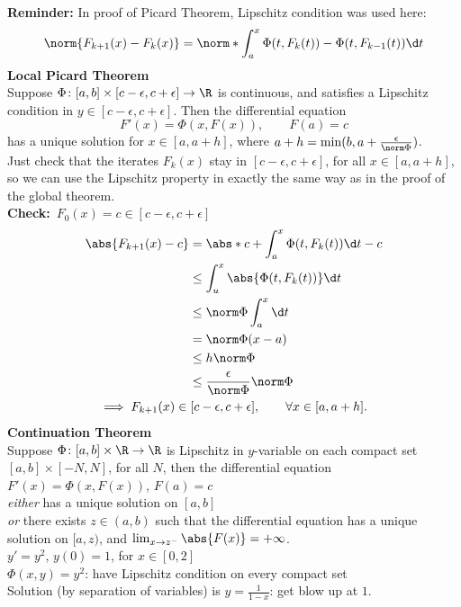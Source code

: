 \textbf{Reminder:} In proof of Picard Theorem, Lipschitz condition was used here:
\[ \norm{F_{k+1}(x)-F_k(x)} = \norm*{\int_a^x\Phi(t,F_k(t))-\Phi(t,F_{k-1}(t))\d t} \]
%
\textbf{Local Picard Theorem} \\
Suppose $\Phi\colon[a,b]\times[c-\epsilon,c+\epsilon]\to\R$ is continuous, and satisfies a Lipschitz condition in $y\in[c-\epsilon,c+\epsilon]$.  Then the differential equation
\[ F'(x) = \Phi(x,F(x)), \qquad F(a) = c \]
has a unique solution for $x\in[a,a+h]$, where $a+h=\min(b,a+\frac{\epsilon}{\norm\Phi})$. \\
\pf Just check that the iterates $F_k(x)$ stay in $[c-\epsilon,c+\epsilon]$, for all $x\in[a,a+h]$, so we can use the Lipschitz property in exactly the same way as in the proof of the global theorem. \\
\textbf{Check:}~$F_0(x)=c\in[c-\epsilon,c+\epsilon]$
\begin{gather*}
\begin{aligned}
\abs{F_{k+1}(x)-c} &= \abs*{c+\int_a^x\Phi(t,F_k(t))\d t-c} \\
&\leq \int_u^x \abs{\Phi(t,F_k(t))} \d t \\
&\leq \norm\Phi \int_a^x\d t \\
&= \norm\Phi(x-a) \\
&\leq h\norm\Phi \\
&\leq \frac{\epsilon}{\norm\Phi}\norm\Phi
\end{aligned} \\
\implies F_{k+1}(x)\in[c-\epsilon,c+\epsilon], \qquad\forall x\in[a,a+h] .
\end{gather*}
%
\textbf{Continuation Theorem} \\
Suppose $\Phi\colon[a,b]\times\R\to\R$ is Lipschitz in $y$-variable on each compact set $[a,b]\times[-N,N]$, for all $N$, then the differential equation $F'(x)=\Phi(x,F(x))$, $F(a)=c$ \\
\emph{either} has a unique solution on $[a,b]$ \\
\emph{or} there exists $z\in(a,b)$ such that the differential equation has a unique solution on $[a,z)$, and $\lim_{x\to z^-}\abs{F(x)}=+\infty$. \\
\ex $y'=y^2$, $y(0)=1$, for $x\in[0,2]$ \\
$\Phi(x,y)=y^2$: have Lipschitz condition on every compact set \\
Solution (by separation of variables) is $y=\frac{1}{1-x}$: get blow up at $1$.
